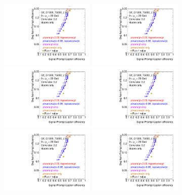 \begin{figure}[phtb!]
\begin{center}
\includegraphics[page=1,width=0.4\textwidth]{FIGURES/ISOLATION/isoMu.pdf}
\includegraphics[page=7,width=0.4\textwidth]{FIGURES/ISOLATION/isoMu.pdf}
\includegraphics[page=2,width=0.4\textwidth]{FIGURES/ISOLATION/isoMu.pdf}
\includegraphics[page=8,width=0.4\textwidth]{FIGURES/ISOLATION/isoMu.pdf}
\includegraphics[page=3,width=0.4\textwidth]{FIGURES/ISOLATION/isoMu.pdf}
\includegraphics[page=9,width=0.4\textwidth]{FIGURES/ISOLATION/isoMu.pdf}

\end{center}
\end{figure}
